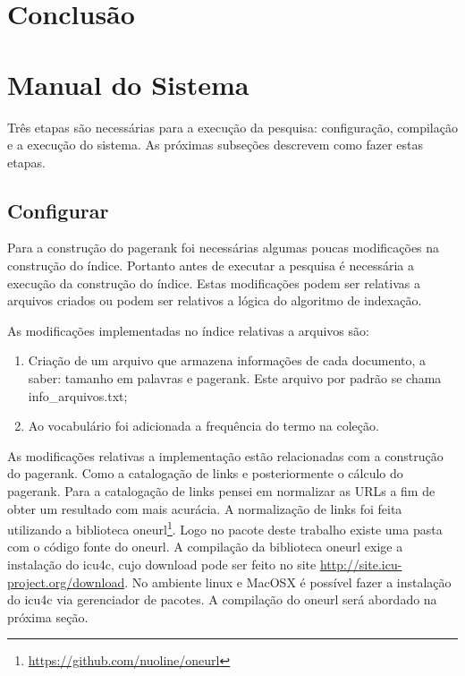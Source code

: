 \documentclass[a4paper]{article}
\begin{document}
\section{Conclusão}

\appendix

\section{Manual do Sistema}

Três etapas são necessárias para a execução da pesquisa: configuração, 
compilação e a execução do sistema. As próximas subseções descrevem 
como fazer estas etapas.

\subsection{Configurar}


Para a construção do pagerank foi necessárias algumas poucas modificações 
na construção do índice. Portanto antes de executar a pesquisa é necessária 
a execução da construção do índice. Estas modificações podem ser relativas 
a arquivos criados ou podem ser relativos a lógica do algoritmo de 
indexação.

As modificações implementadas no índice relativas a arquivos são:

\begin{enumerate}
   \item Criação de um arquivo que armazena informações de cada documento, a saber: 
tamanho em palavras e pagerank. Este arquivo por padrão se chama info\_arquivos.txt;
   \item Ao vocabulário foi adicionada a frequência do termo na coleção.
\end{enumerate}

As modificações relativas a implementação estão relacionadas com a construção 
do pagerank. Como a catalogação de links e posteriormente o cálculo do pagerank.  
Para a catalogação de links pensei em normalizar as URLs a fim de obter um 
resultado com mais acurácia. A normalização de links foi feita utilizando 
a biblioteca oneurl\footnote{\url{https://github.com/nuoline/oneurl}}. Logo 
no pacote deste trabalho existe uma pasta com o código fonte do oneurl. 
A compilação da biblioteca oneurl exige a instalação do icu4c, cujo download 
pode ser feito no site \url{http://site.icu-project.org/download}. No ambiente linux e 
MacOSX é possível fazer a instalação do icu4c via gerenciador de pacotes. A 
compilação do oneurl será abordado na próxima seção.
\end{document}
